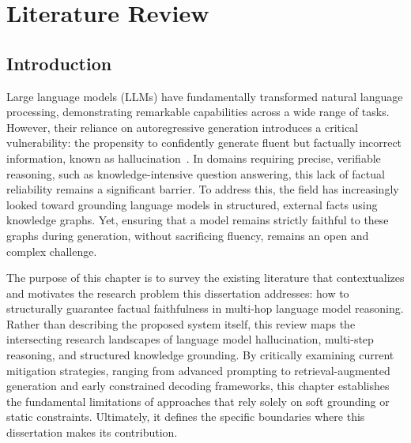 
\chapter{Literature Review}

\section{Introduction}

Large language models (LLMs) have fundamentally transformed natural language processing, demonstrating remarkable capabilities across a wide range of tasks. However, their reliance on autoregressive generation introduces a critical vulnerability: the propensity to confidently generate fluent but factually incorrect information, known as hallucination~\citep{ji2023survey}. In domains requiring precise, verifiable reasoning, such as knowledge-intensive question answering, this lack of factual reliability remains a significant barrier. To address this, the field has increasingly looked toward grounding language models in structured, external facts using knowledge graphs. Yet, ensuring that a model remains strictly faithful to these graphs during generation, without sacrificing fluency, remains an open and complex challenge.

The purpose of this chapter is to survey the existing literature that contextualizes and motivates the research problem this dissertation addresses: how to structurally guarantee factual faithfulness in multi-hop language model reasoning. Rather than describing the proposed system itself, this review maps the intersecting research landscapes of language model hallucination, multi-step reasoning, and structured knowledge grounding. By critically examining current mitigation strategies, ranging from advanced prompting to retrieval-augmented generation and early constrained decoding frameworks, this chapter establishes the fundamental limitations of approaches that rely solely on soft grounding or static constraints. Ultimately, it defines the specific boundaries where this dissertation makes its contribution.

